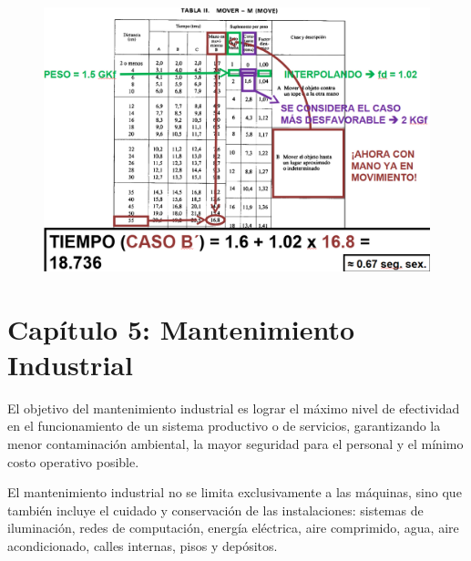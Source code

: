 \documentclass[a4paper,oneside,11pt]{article}
\begin{document}
\begin{figure} [ht!]
    \centering
    \includegraphics[scale=.5]{ejemplo mover 2.png}
\end{figure}

\clearpage

\clearpage


\section{Capítulo 5: Mantenimiento Industrial}

El objetivo del mantenimiento industrial es lograr el máximo nivel de efectividad en el funcionamiento de un sistema productivo o de servicios, garantizando la menor contaminación ambiental, la mayor seguridad para el personal y el mínimo costo operativo posible.

El mantenimiento industrial no se limita exclusivamente a las máquinas, sino que también incluye el cuidado y conservación de las instalaciones: sistemas de iluminación, redes de computación, energía eléctrica, aire comprimido, agua, aire acondicionado, calles internas, pisos y depósitos.
\end{document}
